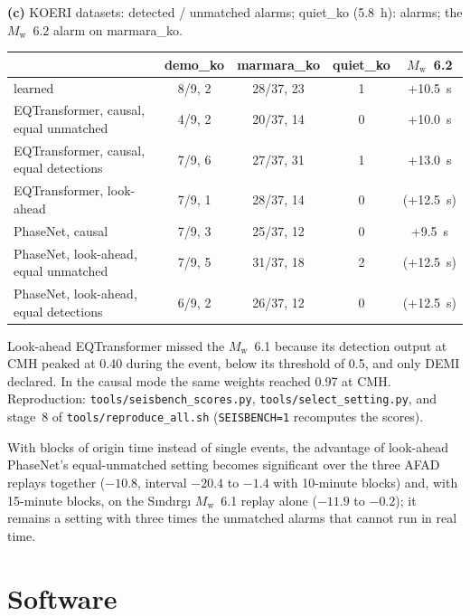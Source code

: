 \documentclass[11pt,a4paper]{article}
\newcommand{\Mw}{$M_\mathrm{w}$}
\newcommand{\tool}[1]{\nolinkurl{#1}}
\newcommand{\panel}[1]{\par\smallskip\noindent\textbf{(#1)}\enskip}
\begin{document}
\begin{table}[htbp]
  \bigskip
  \panel{c} KOERI datasets: detected / unmatched alarms; quiet\_ko (5.8~h):
  alarms; the \Mw{}~6.2 alarm on marmara\_ko.\par\smallskip
  \begin{tabular}{@{}lcccc@{}}
    \toprule
    & demo\_ko & marmara\_ko & quiet\_ko & \Mw{}~6.2 \\
    \midrule
    learned & 8/9, 2 & 28/37, 23 & 1 & +10.5~s \\
    EQTransformer, causal, equal unmatched & 4/9, 2 & 20/37, 14 & 0 & +10.0~s \\
    EQTransformer, causal, equal detections & 7/9, 6 & 27/37, 31 & 1 & +13.0~s \\
    EQTransformer, look-ahead & 7/9, 1 & 28/37, 14 & 0 & (+12.5~s) \\
    PhaseNet, causal & 7/9, 3 & 25/37, 12 & 0 & +9.5~s \\
    PhaseNet, look-ahead, equal unmatched & 7/9, 5 & 31/37, 18 & 2 & (+12.5~s) \\
    PhaseNet, look-ahead, equal detections & 6/9, 2 & 26/37, 12 & 0 & (+12.5~s) \\
    \bottomrule
  \end{tabular}
\end{table}

\noindent Look-ahead EQTransformer missed the \Mw{}~6.1 because its detection output at CMH peaked at 0.40 during the event, below its threshold of 0.5, and only DEMI declared. In the causal mode the same weights reached 0.97 at CMH. Reproduction: \tool{tools/seisbench_scores.py},
\tool{tools/select_setting.py}, and stage~8 of \tool{tools/reproduce_all.sh}
(\tool{SEISBENCH=1} recomputes the scores).

\noindent With blocks of origin time instead of single events, the advantage of
look-ahead PhaseNet's equal-unmatched setting becomes significant over the three
AFAD replays together ($-10.8$, interval $-20.4$ to $-1.4$ with 10-minute blocks)
and, with 15-minute blocks, on the S\i{}nd\i{}rg\i{} \Mw{}~6.1 replay alone ($-11.9$ to $-0.2$); it
remains a setting with three times the unmatched alarms that cannot run in real
time.

\clearpage
\section{Software}\label{s:software}
\end{document}
